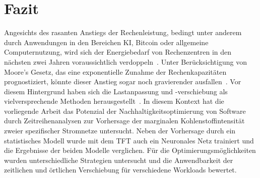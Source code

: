 \chapter{Fazit}\label{CAP:resumee}
\noindent Angesichts des rasanten Anstiegs der Rechenleistung, bedingt unter anderem durch Anwendungen in den Bereichen \ac{KI}, Bitcoin oder allgemeine Computernutzung, wird sich der Energiebedarf von Rechenzentren in den nächsten zwei Jahren voraussichtlich verdoppeln~\cite{WattTime.12.3.2024}.
Unter Berücksichtigung von Moore's Gesetz, das eine exponentielle Zunahme der Rechenkapazitäten prognostiziert, könnte dieser Anstieg sogar noch gravierender ausfallen~\cite{Intel.20240305}.
Vor diesem Hintergrund haben sich die Lastanpassung und -verschiebung als vielversprechende Methoden herausgestellt~\cite{WattTime.12.3.2024}.
In diesem Kontext hat die vorliegende Arbeit das Potenzial der Nachhaltigkeitsoptimierung von Software durch Zeitreihenanalysen zur Vorhersage der marginalen Kohlenstoffintensität zweier spezifischer Stromnetze untersucht.
Neben der Vorhersage durch ein statistisches Modell wurde mit dem \ac{TFT} auch ein Neuronales Netz trainiert und die Ergebnisse der beiden Modelle verglichen.
Für die Optimierungsmöglichkeiten wurden unterschiedliche Strategien untersucht und die Anwendbarkeit der zeitlichen und örtlichen Verschiebung für verschiedene Workloads bewertet.



